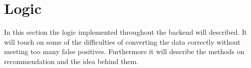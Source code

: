 \section{Logic}
\label{sec:logic}

In this section the logic implemented throughout the backend will described. It will touch on some of the difficulties of converting the data correctly without meeting too many false positives. Furthermore it will describe the methods on recommendation and the idea behind them.


